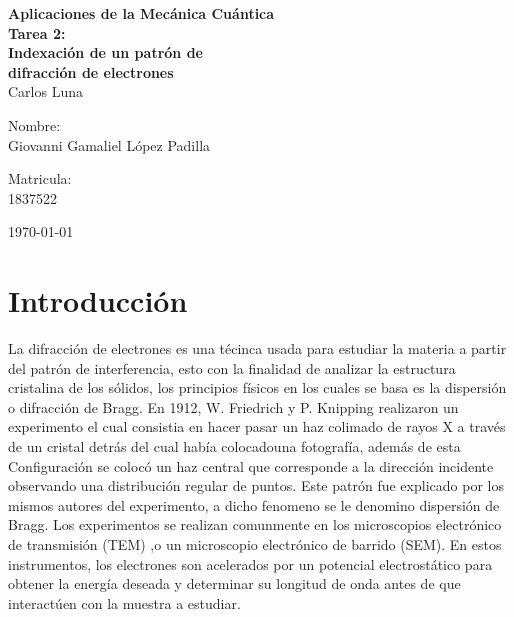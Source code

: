 \documentclass[reprint,amsmath,amssymb,aps,]{revtex4-2}
\begin{document}
\begin{titlepage}
\begin{center}
\begin{large}
\vspace{1cm}
\large{\textbf{Aplicaciones de la Mecánica Cuántica}}\vspace{1.5cm}\\
\textbf{Tarea 2:\\ Indexación de un patrón de \\difracción de electrones}\\
Carlos Luna\\
\end{large}
\vspace{3.5cm}
\begin{minipage}{0.6\linewidth}
\vspace{0.5cm}
\changefontsizes{14pt}
Nombre:\\
Giovanni Gamaliel López Padilla\\
\end{minipage}
\begin{minipage}{0.2\linewidth}
\changefontsizes{14pt}
Matricula:\\
1837522\\
\end{minipage}
\end{center}
\vspace{4cm}
\begin{flushright}
\today
\end{flushright}
\pagebreak
\end{titlepage}
\maketitle
\section{Introducción}
La difracción de electrones es una t\'ecinca usada para estudiar la 
materia a partir del patr\'on  de interferencia, esto con la finalidad de 
analizar la estructura cristalina de los s\'olidos, los principios físicos en los cuales se basa es la 
dispersión o difracción de Bragg. En 1912, W. Friedrich y P. Knipping realizaron un experimento el cual consistia en
hacer pasar un haz colimado de rayos X a través de un cristal detrás del cual había colocadouna fotografía, además de esta Configuración
se colocó un haz central que corresponde a la dirección incidente observando una distribución regular de puntos. Este patrón fue explicado por los mismos autores
del experimento, a dicho fenomeno se le denomino dispersión de Bragg. Los experimentos se realizan comunmente en los microscopios electrónico de transmisión (TEM)
,o un microscopio electrónico de barrido (SEM). En estos instrumentos, los electrones son acelerados por un potencial electrostático para obtener la energía deseada
y determinar su longitud de onda antes de que interactúen con la muestra a estudiar.
\end{document}
